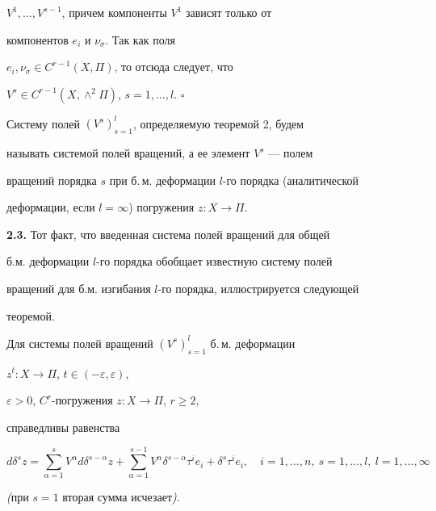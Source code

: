 $V^1,\dotsc,V^{s-1}$, причем компоненты $V^1$ зависят только от


компонентов $e_i$ и $\nu_{\sigma}$. Так как поля


$e_i,\nu_{\sigma}\in C^{r-1}(X,\Pi)$, то отсюда следует, что


$V^s\in C^{r-1}(X,\wedge^2\Pi)$, $s=1,\dotsc,l$. $\square$





Систему полей $(V^s)_{s=1}^l$, определяемую теоремой 2, будем


называть системой полей вращений, а ее элемент $V^s$ --- полем


вращений порядка $s$ при б.\,м. деформации $l$-го порядка (аналитической


деформации, если $l= \infty$) погружения $z: X\to \Pi$.


\medskip





{\bf 2.3.} Тот факт, что введенная система полей вращений для общей


б.м. деформации $l$-го порядка обобщает известную систему полей


вращений для б.м. изгибания $l$-го порядка, иллюстрируется следующей


теоремой.





\begin{thm}


Для системы полей вращений $(V^s)_{s=1}^l$ б.\,м. деформации


$z^t: X\to \Pi$, $t\in (-\varepsilon,\varepsilon)$,


$\varepsilon> 0$, $C^r$-погружения $z: X\to \Pi$, $r\ge 2$,


справедливы равенства


\begin{equation}


d\delta^sz=\sum_{\alpha=1}^{s}V^{\alpha}d\delta^{s-\alpha}z+


\sum_{\alpha=1}^{s-1}V^{\alpha}\delta^{s-\alpha}\tau^ie_i+


\delta^s\tau^ie_i,\quad


i=1,\dotsc,n,\ s=1,\dotsc,l,\ l=1,\dotsc,\infty


\end{equation}


{\em (}при $s=1$ вторая сумма исчезает{\em )}.


\end{thm}





